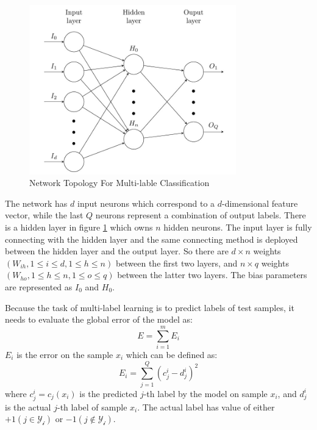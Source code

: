 \graphicspath{ {./Figures/} }
\begin{figure}[!htb]
\centering
\includegraphics[width=0.8\textwidth]{MultiLabelNet.jpeg}
\caption{\label{fig:MultiLabelNet}Network Topology For Multi-lable Classification}
\end{figure}

The network has $d$ input neurons which correspond to a $d$-dimensional feature vector, while the last $Q$ neurons represent a combination of output labels. There is a hidden layer in figure \ref{fig:MultiLabelNet} which owns $n$ hidden neurons. The input layer is fully connecting with the hidden layer and the same connecting method is deployed between the hidden layer and the output layer. So there are $d \times n$ weights $(W_{ih}, 1 \leq i \leq d, 1 \leq h \leq n)$ between the first two layers, and $n \times q$ weights $(W_{ho}, 1 \leq h \leq n , 1 \leq o \leq q)$ between the latter two layers. The bias parameters are represented as $I_{0}$ and  $H_{0}$.

Because the task of multi-label learning is to predict labels of test samples, it needs to evaluate the global error of the model as:
\begin{equation}\label{eq:MultiLableError}
E = \sum_{i=1}^m E_{i}
\end{equation}
$E_{i}$ is the error on the sample $x_{i}$ which can be defined as:
\begin{equation}\label{eq:MultiLableSamError}
E_{i} = \sum_{j=1}^Q (c_{j}^i - d_{j}^i)^2
\end{equation}
where $c_{j}^i = c_{j}(x_{i})$ is the predicted $j$-th label by the model on sample $x_{i}$, and $d_{j}^i$ is the actual $j$-th label of sample $x_{i}$. The actual label has value of either $+1 (j \in \mathcal{Y_{i}})$ or $-1 (j \notin \mathcal{Y_{i}})$.

